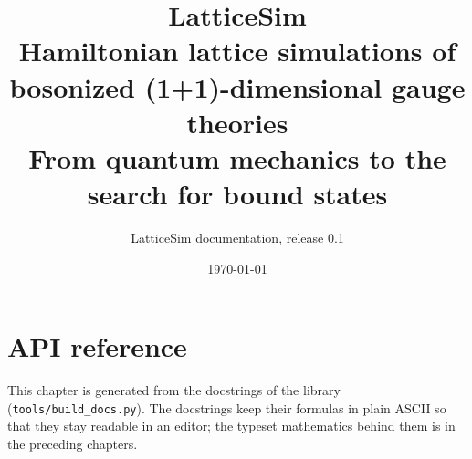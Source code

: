 \documentclass[11pt,a4paper]{report}
\title{\textbf{LatticeSim}\\[0.5em]
  \large Hamiltonian lattice simulations of bosonized (1+1)-dimensional gauge theories\\[0.3em]
  \normalsize From quantum mechanics to the search for bound states}
\author{LatticeSim documentation, release 0.1}
\date{\today}
\theoremstyle{definition}
\theoremstyle{plain}
\theoremstyle{remark}
\numberwithin{equation}{chapter}
\begin{document}
\maketitle
\tableofcontents









\appendix

\chapter{API reference}\label{chap:api}
This chapter is generated from the docstrings of the library (\texttt{tools/build\_docs.py}). The docstrings keep
their formulas in plain ASCII so that they stay readable in an editor; the typeset mathematics behind them is in
the preceding chapters.


\end{document}
